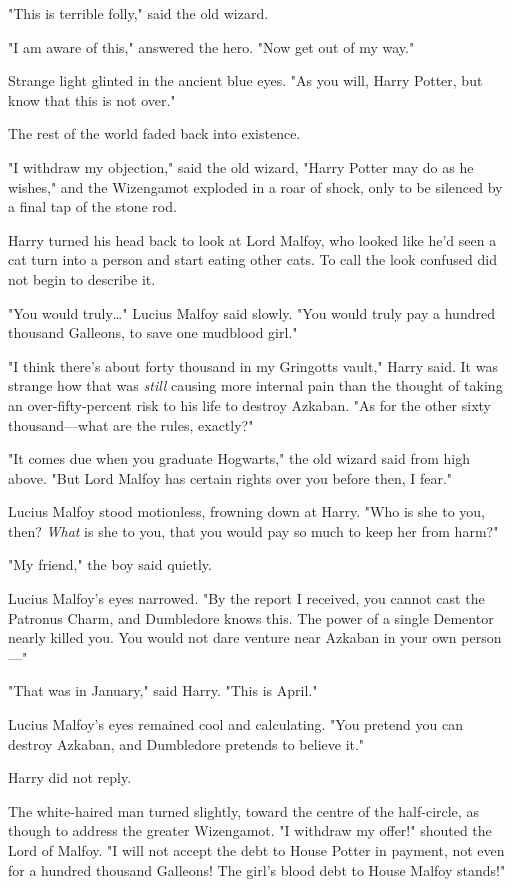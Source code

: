 "This is terrible folly," said the old wizard.

"I am aware of this," answered the hero. "Now get out of my way."

Strange light glinted in the ancient blue eyes. "As you will, Harry Potter, but
know that this is not over."

The rest of the world faded back into existence.

"I withdraw my objection," said the old wizard, "Harry Potter may do as he
wishes," and the Wizengamot exploded in a roar of shock, only to be silenced by
a final tap of the stone rod.

Harry turned his head back to look at Lord Malfoy, who looked like he'd seen a
cat turn into a person and start eating other cats. To call the look confused
did not begin to describe it.

"You would truly…" Lucius Malfoy said slowly. "You would truly pay a
hundred thousand Galleons, to save one mudblood girl."

"I think there's about forty thousand in my Gringotts vault," Harry said. It
was strange how that was \emph{still} causing more internal pain than the
thought of taking an over-fifty-percent risk to his life to destroy Azkaban.
"As for the other sixty thousand—what are the rules, exactly?"

"It comes due when you graduate Hogwarts," the old wizard said from high above.
"But Lord Malfoy has certain rights over you before then, I fear."

Lucius Malfoy stood motionless, frowning down at Harry. "Who is she to you,
then? \emph{What} is she to you, that you would pay so much to keep her from
harm?"

"My friend," the boy said quietly.

Lucius Malfoy's eyes narrowed. "By the report I received, you cannot cast the
Patronus Charm, and Dumbledore knows this. The power of a single Dementor
nearly killed you. You would not dare venture near Azkaban in your own
person—"

"That was in January," said Harry. "This is April."

Lucius Malfoy's eyes remained cool and calculating. "You pretend you can
destroy Azkaban, and Dumbledore pretends to believe it."

Harry did not reply.

The white-haired man turned slightly, toward the centre of the half-circle, as
though to address the greater Wizengamot. "I withdraw my offer!" shouted the
Lord of Malfoy. "I will not accept the debt to House Potter in payment, not
even for a hundred thousand Galleons! The girl's blood debt to House Malfoy
stands!"

